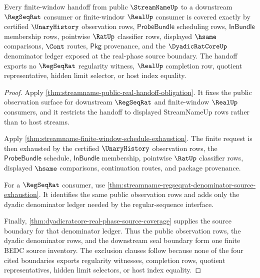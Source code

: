 \begin{theorem}
\label{thm:streamname-regseqrat-realup-observation-coverage}
Every finite-window handoff from public $\StreamNameUp$ to a downstream
$\RegSeqRat$ consumer or finite-window $\RealUp$ consumer is covered exactly by
certified $\UnaryHistory$ observation rows, $\mathsf{ProbeBundle}$ scheduling
rows, $\mathsf{InBundle}$ membership rows, pointwise $\RatUp$ classifier rows,
displayed $\hsame$ comparisons, $\Cont$ routes, $\mathsf{Pkg}$ provenance, and
the $\DyadicRatCoreUp$ denominator ledger exposed at the real-phase source
boundary. The handoff exports no $\RegSeqRat$ regularity witness, $\RealUp$
completion row, quotient representative, hidden limit selector, or host index
equality.
\end{theorem}
\begin{proof}
Apply \autoref{thm:streamname-public-real-handoff-obligation}. It fixes the
public observation surface for downstream $\RegSeqRat$ and finite-window
$\RealUp$ consumers, and it restricts the handoff to displayed StreamNameUp
rows rather than to host streams.

Apply \autoref{thm:streamname-finite-window-schedule-exhaustion}. The finite
request is then exhausted by the certified $\UnaryHistory$ observation rows,
the $\mathsf{ProbeBundle}$ schedule, $\mathsf{InBundle}$ membership, pointwise
$\RatUp$ classifier rows, displayed $\hsame$ comparisons, continuation routes,
and package provenance.

For a $\RegSeqRat$ consumer, use
\autoref{thm:streamname-regseqrat-denominator-source-exhaustion}. It identifies
the same public observation rows and adds only the dyadic denominator ledger
needed by the regular-sequence interface.

Finally, \autoref{thm:dyadicratcore-real-phase-source-coverage} supplies the
source boundary for that denominator ledger. Thus the public observation rows,
the dyadic denominator rows, and the downstream seal boundary form one finite
BEDC source inventory. The exclusion clauses follow because none of the four
cited boundaries exports regularity witnesses, completion rows, quotient
representatives, hidden limit selectors, or host index equality.
\end{proof}

